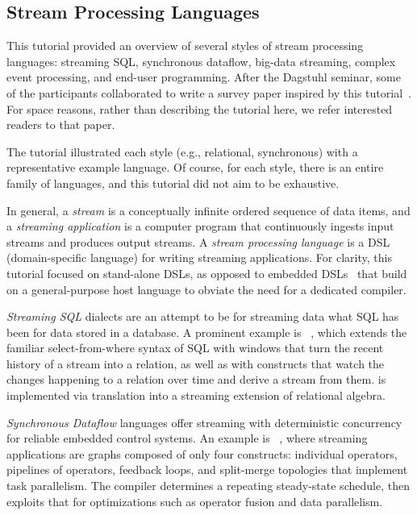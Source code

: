 \subsection{Stream Processing Languages}\label{sec:tut_lang}

This tutorial provided an overview of several styles of stream
processing languages: streaming SQL, synchronous dataflow, big-data
streaming, complex event processing, and end-user programming. After
the Dagstuhl seminar, some of the participants collaborated to write a
survey paper inspired by this tutorial~\cite{hirzel_et_al_2018}. For
space reasons, rather than describing the tutorial here, we refer
interested readers to that paper.

\iffalse
The tutorial illustrated each style (e.g., relational,
synchronous) with a representative example language. Of course,
for each style, there is an entire family of languages, and this
tutorial did not aim to be exhaustive.

In general, a \emph{stream} is a conceptually infinite ordered
sequence of data items, and a \emph{streaming application} is a
computer program that continuously ingests input streams and produces
output streams.  A \emph{stream processing language} is a DSL
(domain-specific language) for writing streaming applications.  For
clarity, this tutorial focused on stand-alone DSLs, as opposed to
embedded DSLs~\cite{hudak_1998} that build on a general-purpose host
language to obviate the need for a dedicated compiler.

\emph{Streaming SQL} dialects are an attempt to be for streaming data
what SQL has been for data stored in a database. A prominent example
is ~\cite{arasu_babu_widom_2006}, which extends the familiar
select-from-where syntax of SQL with windows that turn the recent
history of a stream into a relation, as well as with constructs that
watch the changes happening to a relation over time and derive a
stream from them.  is implemented via translation into a streaming
extension of relational algebra.

\emph{Synchronous Dataflow} languages offer streaming with
deterministic concurrency for reliable embedded control systems. An
example is ~\cite{thies_et_al_2002}, where streaming
applications are graphs composed of only four constructs: individual
operators, pipe\-lines of operators, feedback loops, and split-merge
topologies that implement task parallelism. The  compiler
determines a repeating steady-state schedule, then exploits that for
optimizations such as operator fusion and data parallelism.

